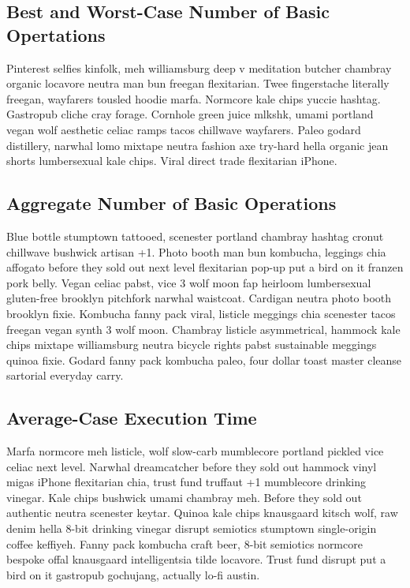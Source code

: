 \documentclass[12pt]{article}
\begin{document}
\subsection{Best and Worst-Case Number of Basic Opertations}
Pinterest selfies kinfolk, meh williamsburg deep v meditation butcher chambray organic locavore neutra man bun freegan flexitarian. Twee fingerstache literally freegan, wayfarers tousled hoodie marfa. Normcore kale chips yuccie hashtag. Gastropub cliche cray forage. Cornhole green juice mlkshk, umami portland vegan wolf aesthetic celiac ramps tacos chillwave wayfarers. Paleo godard distillery, narwhal lomo mixtape neutra fashion axe try-hard hella organic jean shorts lumbersexual kale chips. Viral direct trade flexitarian iPhone.
\subsection{Aggregate Number of Basic Operations}
Blue bottle stumptown tattooed, scenester portland chambray hashtag cronut chillwave bushwick artisan +1. Photo booth man bun kombucha, leggings chia affogato before they sold out next level flexitarian pop-up put a bird on it franzen pork belly. Vegan celiac pabst, vice 3 wolf moon fap heirloom lumbersexual gluten-free brooklyn pitchfork narwhal waistcoat. Cardigan neutra photo booth brooklyn fixie. Kombucha fanny pack viral, listicle meggings chia scenester tacos freegan vegan synth 3 wolf moon. Chambray listicle asymmetrical, hammock kale chips mixtape williamsburg neutra bicycle rights pabst sustainable meggings quinoa fixie. Godard fanny pack kombucha paleo, four dollar toast master cleanse sartorial everyday carry.
\subsection{Average-Case Execution Time}
Marfa normcore meh listicle, wolf slow-carb mumblecore portland pickled vice celiac next level. Narwhal dreamcatcher before they sold out hammock vinyl migas iPhone flexitarian chia, trust fund truffaut +1 mumblecore drinking vinegar. Kale chips bushwick umami chambray meh. Before they sold out authentic neutra scenester keytar. Quinoa kale chips knausgaard kitsch wolf, raw denim hella 8-bit drinking vinegar disrupt semiotics stumptown single-origin coffee keffiyeh. Fanny pack kombucha craft beer, 8-bit semiotics normcore bespoke offal knausgaard intelligentsia tilde locavore. Trust fund disrupt put a bird on it gastropub gochujang, actually lo-fi austin.
\end{document}
